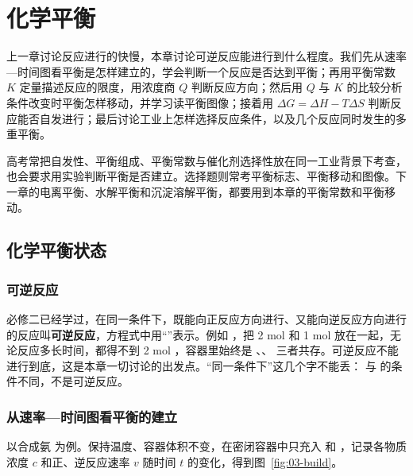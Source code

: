 \documentclass[UTF8,a4paper,zihao=5,oneside,openany,fontset=none]{ctexbook}
\begin{document}
\chapter{化学平衡}

上一章讨论反应进行的快慢，本章讨论可逆反应能进行到什么程度。我们先从速率—时间图看平衡是怎样建立的，学会判断一个反应是否达到平衡；再用平衡常数 $K$ 定量描述反应的限度，用浓度商 $Q$ 判断反应方向；然后用 $Q$ 与 $K$ 的比较分析条件改变时平衡怎样移动，并学习读平衡图像；接着用 $\Delta G=\Delta H-T\Delta S$ 判断反应能否自发进行；最后讨论工业上怎样选择反应条件，以及几个反应同时发生的多重平衡。

高考常把自发性、平衡组成、平衡常数与催化剂选择性放在同一工业背景下考查，也会要求用实验判断平衡是否建立。选择题则常考平衡标志、平衡移动和图像。下一章的电离平衡、水解平衡和沉淀溶解平衡，都要用到本章的平衡常数和平衡移动。

\section{化学平衡状态}

\subsection{可逆反应}
必修二已经学过，在同一条件下，既能向正反应方向进行、又能向逆反应方向进行的反应叫\textbf{可逆反应}，方程式中用“\ce{<=>}”表示。例如 ，把 2 mol  和 1 mol  放在一起，无论反应多长时间，都得不到 2 mol ，容器里始终是 、、 三者共存。可逆反应不能进行到底，这是本章一切讨论的出发点。“同一条件下”这几个字不能丢： 与  的条件不同，不是可逆反应。

\subsection{从速率—时间图看平衡的建立}
以合成氨  为例。保持温度、容器体积不变，在密闭容器中只充入  和 ，记录各物质浓度 $c$ 和正、逆反应速率 $v$ 随时间 $t$ 的变化，得到图~\ref{fig:03-build}。
\end{document}
